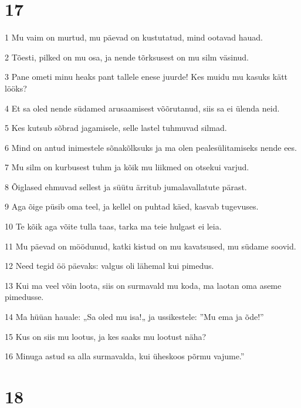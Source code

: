 \chapter{17}

\par 1 Mu vaim on murtud, mu päevad on kustutatud, mind ootavad hauad.
\par 2 Tõesti, pilked on mu osa, ja nende tõrksusest on mu silm väsinud.
\par 3 Pane ometi minu heaks pant tallele enese juurde! Kes muidu mu kasuks kätt lööks?
\par 4 Et sa oled nende südamed arusaamisest võõrutanud, siis sa ei ülenda neid.
\par 5 Kes kutsub sõbrad jagamisele, selle lastel tuhmuvad silmad.
\par 6 Mind on antud inimestele sõnakõlksuks ja ma olen pealesülitamiseks nende ees.
\par 7 Mu silm on kurbusest tuhm ja kõik mu liikmed on otsekui varjud.
\par 8 Õiglased ehmuvad sellest ja süütu ärritub jumalavallatute pärast.
\par 9 Aga õige püsib oma teel, ja kellel on puhtad käed, kasvab tugevuses.
\par 10 Te kõik aga võite tulla taas, tarka ma teie hulgast ei leia.
\par 11 Mu päevad on möödunud, katki kistud on mu kavatsused, mu südame soovid.
\par 12 Need tegid öö päevaks: valgus oli lähemal kui pimedus.
\par 13 Kui ma veel võin loota, siis on surmavald mu koda, ma laotan oma aseme pimedusse.
\par 14 Ma hüüan hauale: „Sa oled mu isa!„ ja ussikestele: ”Mu ema ja õde!”
\par 15 Kus on siis mu lootus, ja kes saaks mu lootust näha?
\par 16 Minuga astud sa alla surmavalda, kui üheskoos põrmu vajume.”

\chapter{18}

